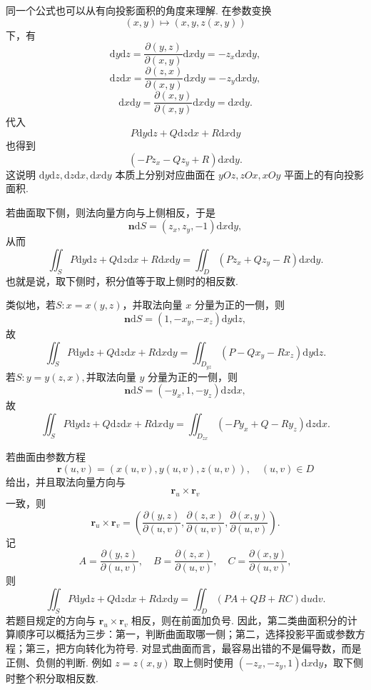 \documentclass{ctexart}
\begin{document}
同一个公式也可以从有向投影面积的角度来理解. 在参数变换
\[
(x,y)\mapsto (x,y,z(x,y))
\]
下，有
\[
\mathrm{d}y\mathrm{d}z
=
\frac{\partial(y,z)}{\partial(x,y)}\mathrm{d}x\mathrm{d}y
=-z_{x}\mathrm{d}x\mathrm{d}y,
\]
\[
\mathrm{d}z\mathrm{d}x
=
\frac{\partial(z,x)}{\partial(x,y)}\mathrm{d}x\mathrm{d}y
=-z_{y}\mathrm{d}x\mathrm{d}y,
\]
\[
\mathrm{d}x\mathrm{d}y
=
\frac{\partial(x,y)}{\partial(x,y)}\mathrm{d}x\mathrm{d}y
=\mathrm{d}x\mathrm{d}y.
\]
代入
\[
P\mathrm{d}y\mathrm{d}z+Q\mathrm{d}z\mathrm{d}x+R\mathrm{d}x\mathrm{d}y
\]
也得到
\[
\left(-Pz_{x}-Qz_{y}+R\right)\mathrm{d}x\mathrm{d}y.
\]
这说明 $\mathrm{d}y\mathrm{d}z,\mathrm{d}z\mathrm{d}x,\mathrm{d}x\mathrm{d}y$ 本质上分别对应曲面在 $yOz,zOx,xOy$ 平面上的有向投影面积.

若曲面取下侧，则法向量方向与上侧相反，于是
\[
\boldsymbol{n}\mathrm{d}S=(z_{x},z_{y},-1)\mathrm{d}x\mathrm{d}y,
\]
从而
\[
\iint_{S}P\mathrm{d}y\mathrm{d}z+Q\mathrm{d}z\mathrm{d}x+R\mathrm{d}x\mathrm{d}y
=
\iint_{D}\left(Pz_{x}+Qz_{y}-R\right)\mathrm{d}x\mathrm{d}y.
\]
也就是说，取下侧时，积分值等于取上侧时的相反数.

类似地，若$S:x=x(y,z)$，并取法向量 $x$ 分量为正的一侧，则
\[
\boldsymbol{n}\mathrm{d}S=(1,-x_{y},-x_{z})\mathrm{d}y\mathrm{d}z,
\]
故
\[
\iint_{S}P\mathrm{d}y\mathrm{d}z+Q\mathrm{d}z\mathrm{d}x+R\mathrm{d}x\mathrm{d}y
=
\iint_{D_{yz}}\left(P-Qx_{y}-Rx_{z}\right)\mathrm{d}y\mathrm{d}z.
\]
若$S:y=y(z,x),$并取法向量 $y$ 分量为正的一侧，则
\[
\boldsymbol{n}\mathrm{d}S=(-y_{x},1,-y_{z})\mathrm{d}z\mathrm{d}x,
\]
故
\[
\iint_{S}P\mathrm{d}y\mathrm{d}z+Q\mathrm{d}z\mathrm{d}x+R\mathrm{d}x\mathrm{d}y
=
\iint_{D_{zx}}\left(-Py_{x}+Q-Ry_{z}\right)\mathrm{d}z\mathrm{d}x.
\]

若曲面由参数方程
\[
\boldsymbol{r}(u,v)=(x(u,v),y(u,v),z(u,v)),\quad (u,v)\in D
\]
给出，并且取法向量方向与
\[
\boldsymbol{r}_{u}\times \boldsymbol{r}_{v}
\]
一致，则
\[
\boldsymbol{r}_{u}\times \boldsymbol{r}_{v}
=
\left(
\frac{\partial(y,z)}{\partial(u,v)},
\frac{\partial(z,x)}{\partial(u,v)},
\frac{\partial(x,y)}{\partial(u,v)}
\right).
\]
记
\[
A=\frac{\partial(y,z)}{\partial(u,v)},\quad
B=\frac{\partial(z,x)}{\partial(u,v)},\quad
C=\frac{\partial(x,y)}{\partial(u,v)},
\]
则
\[
\iint_{S}P\mathrm{d}y\mathrm{d}z+Q\mathrm{d}z\mathrm{d}x+R\mathrm{d}x\mathrm{d}y
=
\iint_{D}(PA+QB+RC)\mathrm{d}u\mathrm{d}v.
\]
若题目规定的方向与 $\boldsymbol{r}_{u}\times \boldsymbol{r}_{v}$ 相反，则在前面加负号. 因此，第二类曲面积分的计算顺序可以概括为三步：第一，判断曲面取哪一侧；第二，选择投影平面或参数方程；第三，把方向转化为符号. 对显式曲面而言，最容易出错的不是偏导数，而是正侧、负侧的判断. 例如 $z=z(x,y)$ 取上侧时使用 $(-z_x,-z_y,1)\mathrm{d}x\mathrm{d}y$，取下侧时整个积分取相反数.
\end{document}
